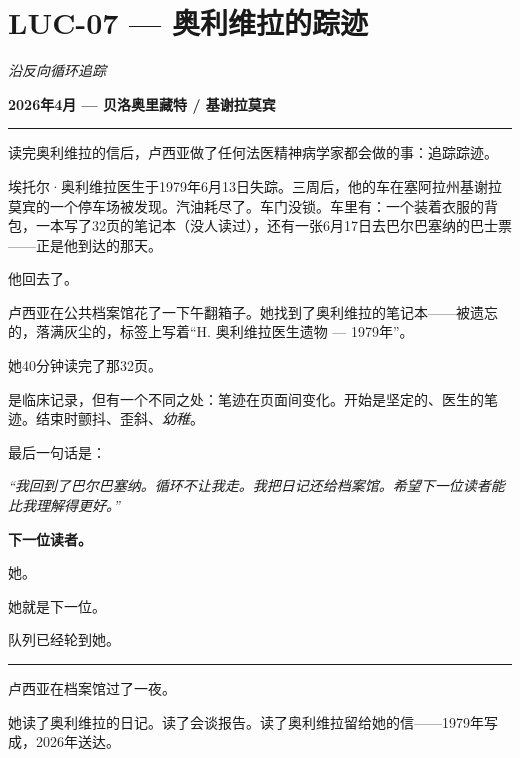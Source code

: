 \section*{\textbf{LUC-07} --- 奥利维拉的踪迹}

\noindent \textit{沿反向循环追踪}

\noindent \textbf{2026年4月 --- 贝洛奥里藏特 / 基谢拉莫宾}

\vspace{0.5em}\noindent\rule{\textwidth}{0.5pt}\vspace{0.5em}

\noindent 读完奥利维拉的信后，卢西亚做了任何法医精神病学家都会做的事：追踪踪迹。

\noindent 埃托尔·奥利维拉医生于1979年6月13日失踪。三周后，他的车在塞阿拉州基谢拉莫宾的一个停车场被发现。汽油耗尽了。车门没锁。车里有：一个装着衣服的背包，一本写了32页的笔记本（没人读过），还有一张6月17日去巴尔巴塞纳的巴士票——正是他到达的那天。

\noindent 他回去了。

\noindent 卢西亚在公共档案馆花了一下午翻箱子。她找到了奥利维拉的笔记本——被遗忘的，落满灰尘的，标签上写着\textquotedblleft{}H. 奥利维拉医生遗物 --- 1979年\textquotedblright{}。

\noindent 她40分钟读完了那32页。

\noindent 是临床记录，但有一个不同之处：笔迹在页面间变化。开始是坚定的、医生的笔迹。结束时颤抖、歪斜、\textit{幼稚}。

\noindent 最后一句话是：

\noindent \textit{\textquotedblleft{}我回到了巴尔巴塞纳。循环不让我走。我把日记还给档案馆。希望下一位读者能比我理解得更好。\textquotedblright{}}

\noindent \textbf{下一位读者。}

\noindent 她。

\noindent 她就是下一位。

\noindent 队列已经轮到她。

\vspace{0.5em}\noindent\rule{\textwidth}{0.5pt}\vspace{0.5em}

\noindent 卢西亚在档案馆过了一夜。

\noindent 她读了奥利维拉的日记。读了会谈报告。读了奥利维拉留给她的信——1979年写成，2026年送达。

